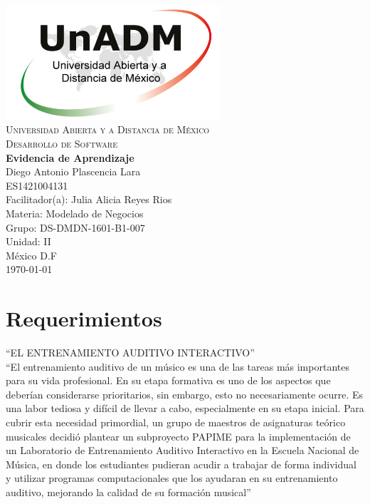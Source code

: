 \documentclass[spanish,12pt,letterpapper]{article}
\begin{document}
	\begin{titlepage}
		\begin{center}
			\includegraphics[width=0.6\textwidth]{../logoUnADM}~\\[1cm] 
			\textsc{Universidad Abierta y a Distancia de México}\\[0.8cm]
			\textsc{Desarrollo de Software}\\[1.8cm]
			
			\textbf{ \Large Evidencia de Aprendizaje}\\[3cm]
			
			Diego Antonio Plascencia Lara\\ ES1421004131 \\[0.4cm]
			Facilitador(a): Julia Alicia Reyes Rios\\
			Materia: Modelado de Negocios\\
			Grupo: DS-DMDN-1601-B1-007 \\
			Unidad: II \\
			
			\vfill México D.F\\{\today}
			
		\end{center}
	\end{titlepage}
	
	\section{Requerimientos}
	
	``EL ENTRENAMIENTO AUDITIVO INTERACTIVO''\\
	
	``El entrenamiento auditivo de un músico es una de las tareas más importantes para su vida profesional. En su etapa formativa es uno de los aspectos que deberían considerarse prioritarios, sin embargo, esto no necesariamente ocurre. Es una labor tediosa y difícil de llevar a cabo, especialmente en su etapa inicial. Para cubrir esta necesidad primordial, un grupo de maestros de asignaturas teórico musicales decidió plantear un subproyecto PAPIME para la implementación de un Laboratorio de Entrenamiento Auditivo Interactivo en la Escuela Nacional de Música, en donde los estudiantes pudieran acudir a trabajar de forma individual y utilizar programas computacionales que los ayudaran en su entrenamiento auditivo, mejorando la calidad de su formación musical''
	
\end{document}
